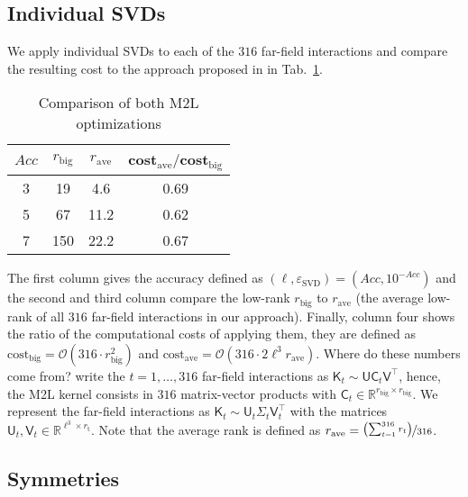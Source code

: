 \documentclass[]{article}
\newcommand{\Mat}[1]{\mathsf{#1}}  %
\theoremstyle{plain}
\begin{document}
\subsection{Individual SVDs}
\label{sec:16svds}
We apply individual SVDs to each of the $316$ far-field interactions and
compare the resulting cost to the approach proposed in \citep{fong09a} in
Tab.~\ref{tab:cost_of_one_vs_many_svds}.
\begin{table}[htbp]
  \caption{Comparison of both M2L optimizations}
  \label{tab:cost_of_one_vs_many_svds}
  \centering
    \begin{tabular}{c | c c | c}
      \toprule
      $Acc$ & $r_{\text{big}}$ & $r_{\text{ave}}$ &
      cost$_{\text{ave}}/$cost$_{\text{big}}$ \\  
      \midrule
      3 &  19 & 4.6  & 0.69 \\
      5 &  67 & 11.2 & 0.62 \\
      7 & 150 & 22.2 & 0.67 \\
      \bottomrule
  \end{tabular}
\end{table}
The first column gives the accuracy defined as
$(\ell,\varepsilon_{\text{SVD}})=(Acc,10^{-Acc})$ and the second and third
column compare the low-rank $r_{\text{big}}$ to $r_{\text{ave}}$ (the average
low-rank of all $316$ far-field interactions in our approach).  Finally,
column four shows the ratio of the computational costs of applying them, they
are defined as $\text{cost}_{\text{big}} = \mathcal{O}(316 \cdot
r_{\text{big}}^2)$ and $\text{cost}_{\text{ave}} = \mathcal{O}(316 \cdot
2\ell^3r_{\text{ave}})$. Where do these numbers come from? \citet{fong09a}
write the $t=1,\dots,316$ far-field interactions as
$\Mat{K}_t\sim\Mat{UC}_t\Mat{V}^\top$, hence, the M2L kernel consists in $316$
matrix-vector products with $\Mat{C}_t\in\mathbb{R}^{r_{\text{big}}\times
  r_{\text{big}}}$. We represent the far-field interactions as
$\Mat{K}_t\sim\Mat{U}_t\Mat{\Sigma}_t\Mat{V}_t^\top$ with the matrices
$\Mat{U}_t,\Mat{V}_t\in\mathbb{R}^{\ell^3\times r_{\text{t}}}$. Note that the
average rank is defined as $r_{\text{ave}} =
\nicefrac{\left(\sum_{t=1}^{316}r_t\right)}{316}$.

\subsection{Symmetries}
\label{sec:symmetries}
\end{document}
